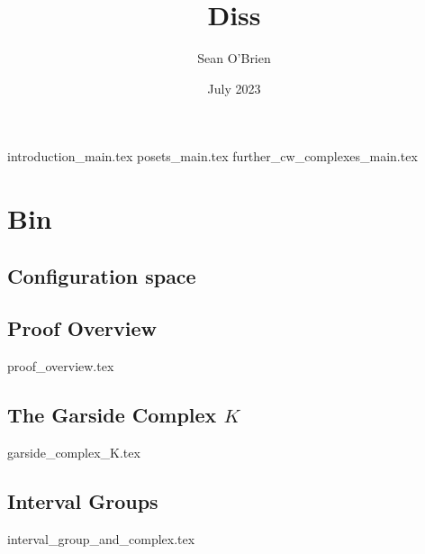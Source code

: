\documentclass[12pt]{article}
\title{Diss}
\author{Sean O'Brien}
\date{July 2023}
\begin{document}
\maketitle
{introduction_main.tex}
{posets_main.tex}
{further_cw_complexes_main.tex}

\section{Bin}
\subsection{Configuration space}
\subsection{Proof Overview}
{proof_overview.tex}
\subsection{The Garside Complex $K$}
{garside_complex_K.tex}
\subsection{Interval Groups}
{interval_group_and_complex.tex}

\printbibliography
\end{document}
